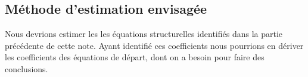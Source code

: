 \documentclass[11pt, a4paper]{article}
\begin{document}
\subsection*{Méthode d'estimation envisagée}
Nous devrions estimer les les équations structurelles identifiés dans la partie précédente de cette note. 
Ayant identifié ces coefficients nous pourrions en dériver les coefficients des équations de départ, dont on a besoin pour faire des conclusions.



\end{document}
